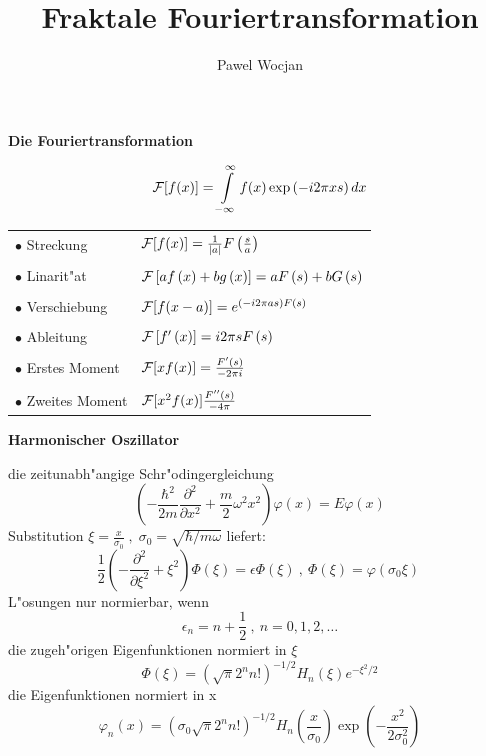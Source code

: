 \documentclass[11pt]{article}
\begin{document}
\newcommand{\iu}{\int\limits_{-\infty}^{\infty}}
\newcommand{\sq}{\sqrt{2\pi}x}
\newcommand{\sqs}{\sqrt{2\pi}s}

\newcommand{\ex}{\exp\left( -i2\pi xs \right)}
\newcommand{\es}{\exp\left( i2\pi xs \right)}

\newcommand{\h}{2^{1/4}}
\newcommand{\gx}{\exp\left( - \pi x^2 \right)}
\newcommand{\gs}{\exp\left( - \pi s^2 \right)}
\newcommand{\db}{\mbox{d}}
\newtheorem{satz}{Satz}

\title{Fraktale Fouriertransformation}
\author{Pawel Wocjan}
\huge
\centerline{\bf\Huge Die Fouriertransformation}
\vfill
$$ {\cal F}[f(x)] = \iu f(x) \ex dx $$
\vfill
\LARGE
\begin{tabular}{ll}
$\bullet$ Streckung &
${\cal F}[f(x)] = \frac{1}{|a|}F\left( \frac{s}{a} \right) $ \\  & \\
$\bullet$ Linarit"at &
${\cal F}\left[ af \left( x \right) + bg \left( x \right) \right] = aF\left( s \right) + bG\left( s \right) $ \\  & \\
$\bullet$ Verschiebung &
${\cal F}[ f( x-a ) ] = e^{\left( -i2\pi as\right) F\left( s \right)} $ \\ & \\
$\bullet$ Ableitung &
${\cal F}\left[ f'\left( x \right) \right] = i2\pi s F\left( s \right) $ \\ & \\
$\bullet$ Erstes Moment &
${\cal F}[ xf(x) ] = \frac{F'(s)}{-2 \pi i} $ \\ & \\
$\bullet$ Zweites Moment &
${\cal F}[ x^2f(x) ] \frac{F''(s)}{-4 \pi} $
\end{tabular}
\vfill
\huge

\newpage
\centerline{\bf \Huge Harmonischer Oszillator}
\vfill
die zeitunabh"angige Schr"odingergleichung
$$  \left( -\frac{\hbar^2}{2m}\frac{\partial^2}{\partial x^2}+\frac{m}{2}\omega^2  x^2 \right) \varphi \left( x \right) = E\varphi\left( x \right) $$
\vfill
Substitution 
$ \xi = \frac{x}{\sigma_0} \;, \;\sigma_0 = \sqrt{\hbar / m\omega} $ liefert:
$$\frac{1}{2}\left(-\frac{\partial^2}{\partial \xi^2} + \xi^2 \right)\Phi\left( \xi \right) =  \epsilon\Phi \left(\xi\right) \: , \: \Phi\left( \xi \right)=\varphi\left(\sigma_0\xi\right) \: $$
\vfill
L"osungen nur normierbar, wenn
$$ \epsilon_n = n + \frac{1}{2} \:, \: n=0, 1,2, \ldots $$
die zugeh"origen Eigenfunktionen normiert in $\xi$ 
$$ \Phi\left(\xi\right) = \left(\sqrt{\pi}2^n n!\right)^{-1/2}H_n \left(\xi\right)e^{-\xi^2/2} $$
\vfill
die Eigenfunktionen normiert in x
$$ \varphi_n\left(x\right)=\left(\sigma_0\sqrt{\pi}2^n n!\right)^{-1/2}H_n\left(\frac{x}{\sigma_0}\right)\exp\left( -\frac{x^2}{2\sigma_0^2}\right) $$
\end{document}
